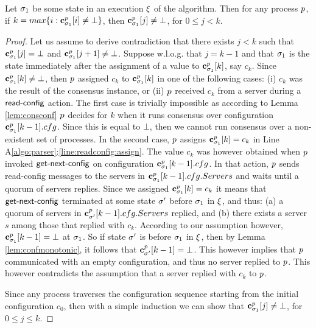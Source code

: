 \begin{lemma}
\label{lem:nogaps}
	Let $\sigma_1$ be some state in an execution $\EX$ of the algorithm. Then for any 
	process $p$, if $k = max\{i: \mathbf{c}^{p}_{\sigma_1}[i]\neq \bot\}$, then 
	$\mathbf{c}^{p}_{\sigma_1}[j]\neq \bot$, for $0\leq j < k$.
\end{lemma}
\begin{proof}
	Let us assume to derive contradiction that there exists $j < k$ such that 
	$\mathbf{c}^{p}_{\sigma_1}[j]=\bot$ and $\mathbf{c}^{p}_{\sigma_1}[j+1]\neq\bot$.
	Suppose w.l.o.g. that $j = k-1$ and that $\sigma_1$ is the state immediately 
	after the assignment of a value to $\mathbf{c}^{p}_{\sigma_1}[k]$, say $c_k$. 
	Since $\mathbf{c}^{p}_{\sigma_1}[k]\neq\bot$, then $p$ assigned $c_k$ to $\mathbf{c}^{p}_{\sigma_1}[k]$ 
	in one of the following cases: 
	(i) $c_k$ was the result of the consensus instance, or
	(ii) $p$ received $c_k$ from a server during a $\act{read-config}$ action.
	The first case is trivially impossible as according to Lemma \ref{lem:consconf} 
	$p$ decides for $k$ when it runs consensus over configuration $\mathbf{c}^{p}_{\sigma_1}[k-1].cfg$. 
	Since this is equal to $\bot$, then we cannot run consensus over a non-existent set of 
	processes. 	In the second case, $p$ assigns $\mathbf{c}^{p}_{\sigma_1}[k] = c_k$  in Line A\ref{algo:parser}:\ref{line:readconfig:assign}.
	The value $c_k$ was however obtained when $p$ invoked $\act{get-next-config}$ on 
	configuration $\mathbf{c}^{p}_{\sigma_1}[k-1].cfg$. In that action, $p$ sends {\sc read-config}
	messages to the servers in $\mathbf{c}^{p}_{\sigma_1}[k-1].cfg.Servers$ and waits until a quorum 
	of servers replies. Since we assigned $\mathbf{c}^{p}_{\sigma_1}[k] = c_k$ it means that $\act{get-next-config}$
	terminated at some state $\sigma'$ before $\sigma_1$ in $\EX$, and thus: 
	(a) a quorum of servers in $\mathbf{c}^{p}_{\sigma'}[k-1].cfg.Servers$
	replied, and (b) there exists a server $s$ among those that replied with $c_k$. 
	According to our assumption however, $\mathbf{c}^{p}_{\sigma_1}[k-1] = \bot$ at $\sigma_1$. 
	So if state $\sigma'$ is before $\sigma_1$ in $\EX$, %
	then by Lemma \ref{lem:confmonotonic}, it follows that $\mathbf{c}^{p}_{\sigma'}[k-1] = \bot$. This however 
	implies that $p$ communicated with an empty configuration, and thus no server replied to $p$. 
	This however contradicts the assumption that a server replied with $c_k$ to $p$. 
	
	Since any process traverses the configuration sequence starting from the initial 
	configuration $c_0$, then with a simple induction we can show that 
	$\mathbf{c}^{p}_{\sigma_1}[j]\neq \bot$, for $0\leq j\leq k$.
\end{proof}

